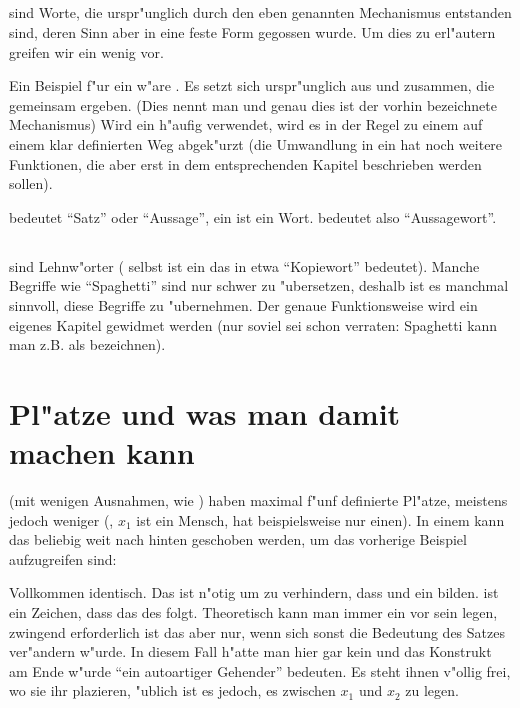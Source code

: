 \subsection{}
 sind Worte, die urspr"unglich durch den eben genannten Mechanismus entstanden sind, deren Sinn aber in eine feste Form gegossen wurde. Um dies zu erl"autern greifen
wir ein wenig vor.

Ein Beispiel f"ur ein  w"are . Es setzt sich urspr"unglich aus  und  zusammen, die gemeinsam  ergeben. (Dies nennt
man  und genau dies ist der vorhin bezeichnete Mechanismus)
Wird ein  h"aufig verwendet, wird es in der Regel zu einem  auf einem klar definierten Weg abgek"urzt (die Umwandlung in ein  hat noch weitere
Funktionen, die aber erst in dem entsprechenden Kapitel beschrieben werden sollen).

 bedeutet ``Satz'' oder ``Aussage'', ein  ist ein Wort.  bedeutet also ``Aussagewort''.

\subsection{}
 sind Lehnw"orter ( selbst ist ein  das in etwa ``Kopiewort'' bedeutet). Manche Begriffe wie ``Spaghetti'' sind nur schwer zu "ubersetzen,
deshalb ist es manchmal sinnvoll, diese Begriffe zu "ubernehmen. Der genaue Funktionsweise wird ein eigenes Kapitel gewidmet werden (nur soviel sei schon verraten: Spaghetti
kann man z.B. als  bezeichnen).

\section{Pl"atze und was man damit machen kann}
 (mit wenigen Ausnahmen, wie ) haben maximal f"unf definierte Pl"atze, meistens jedoch weniger (, $x_1$ ist ein Mensch, hat beispielsweise nur einen).
In einem  kann das  beliebig weit nach hinten geschoben werden, um das vorherige Beispiel aufzugreifen sind:
\begin{quote}
\end{quote}
Vollkommen identisch. Das  ist n"otig um zu verhindern, dass  und  ein  bilden.  ist ein Zeichen, dass das  des
 folgt. Theoretisch kann man immer ein  vor sein  legen, zwingend erforderlich ist das aber nur, wenn sich sonst
die Bedeutung des Satzes ver"andern w"urde. In diesem Fall h"atte man hier gar kein  und das Konstrukt am Ende w"urde ``ein autoartiger Gehender'' bedeuten.
Es steht ihnen v"ollig frei, wo sie ihr  plazieren, "ublich ist es jedoch, es zwischen $x_1$ und $x_2$ zu legen.

